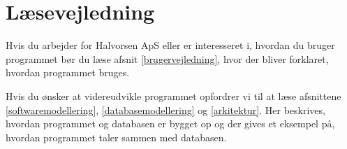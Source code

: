 \section{Læsevejledning}

Hvis du arbejder for Halvorsen ApS eller er interesseret i, hvordan du bruger programmet bør du læse afsnit \ref{brugervejledning}, hvor der bliver forklaret, hvordan programmet bruges.

Hvis du ønsker at videreudvikle programmet opfordrer vi til at læse afsnittene \ref{softwaremodellering}, \ref{databasemodellering} og \ref{arkitektur}. Her beskrives, hvordan programmet og databasen er bygget op og der gives et eksempel på, hvordan programmet taler sammen med databasen.